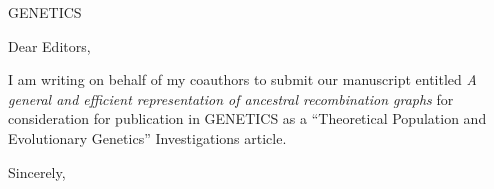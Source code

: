 \documentclass{letter}
\begin{document}
\begin{letter}{GENETICS}

\opening{Dear Editors,}

I am writing on behalf of my coauthors to submit our manuscript entitled
\emph{A general and efficient representation of ancestral recombination graphs}
for consideration for publication in GENETICS
as a ``Theoretical Population and Evolutionary Genetics''
Investigations article.

\closing{Sincerely,}

\end{letter}
\end{document}
